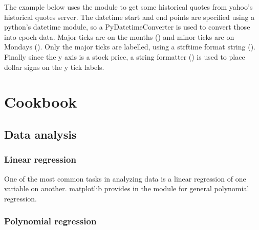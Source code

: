 \documentclass[twoside]{book}
\begin{document}
The example below uses the  module to get
some historical quotes from yahoo's historical quotes server.  The
datetime start and end points are specified using a python's datetime
module, so a PyDatetimeConverter is used to convert those into epoch
data.  Major ticks are on the months () and minor
ticks are on Mondays ().  Only the major ticks
are labelled, using a strftime format string ().
Finally since the y axis is a stock price, a string formatter
() is used to place dollar signs on the y
tick labels.









\chapter{Cookbook}
\label{cha:cookbook}

\section{Data analysis}

\subsection{Linear regression}
\label{cbook:linear_regression}

One of the most common tasks in analyzing data is a linear regression
of one variable on another.  matplotlib provides  in the
 module for general polynomial regression.





\subsection{Polynomial regression}
\label{cbook:polynomial_regression}
\end{document}

